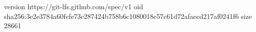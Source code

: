 version https://git-lfs.github.com/spec/v1
oid sha256:3e2e3784a60fcfe73c287424b758b6c1080018e57c61d72afaecd217af0241f6
size 28661
